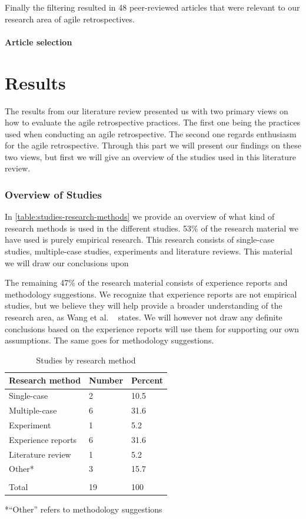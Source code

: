 \documentclass[12pt]{article}
\begin{document}
Finally the filtering resulted in 48 peer-reviewed articles that were relevant to our research area of agile retrospectives. 

\subsection{Article selection}



\clearpage

\part{Results}
The results from our literature review presented us with two primary views on how to evaluate the agile retrospective practices. The first one being the practices used when conducting an agile retrospective. The second one regards enthusiasm for the agile retrospective. Through this part we will present our findings on these two views, but first we will give an overview of the studies used in this literature review. 

\section{Overview of Studies}
In \autoref{table:studies-research-methods} we provide an overview of what kind of research methods is used in the different studies. 53\% of the research material we have used is purely empirical research. This research consists of single-case studies, multiple-case studies, experiments and literature reviews. This material we will draw our conclusions upon 

The remaining 47\% of the research material consists of experience reports and methodology suggestions. We recognize that experience reports are not empirical studies, but we believe they will help provide a broader understanding of the research area, as Wang et al. ~\cite{Wang2012} states. We will however not draw any definite conclusions based on the experience reports will use them for supporting our own assumptions. The same goes for methodology suggestions. 

\begin{table}[!h]
	\centering
	\caption{Studies by research method}
	\label{table:studies-research-methods}
	\begin{tabular}{ p{} p{} p{}}
		\hline
		Research method & Number & Percent \\ \hline
		Single-case & 2 & 10.5 \\
		Multiple-case & 6 & 31.6 \\
		Experiment & 1 & 5.2 \\
		Experience reports & 6 & 31.6 \\
		Literature review & 1 & 5.2 \\
		Other* & 3 & 15.7 \\
		\\
		Total & 19 & 100 \\ \hline
	\end{tabular}
	*``Other'' refers to methodology suggestions
\end{table}
\end{document}
